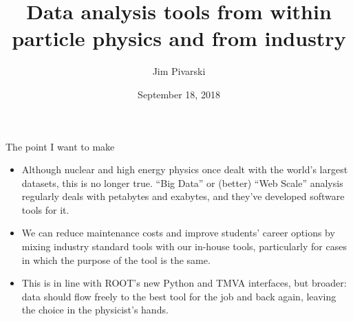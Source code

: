 \documentclass[aspectratio=169]{beamer}
\title[2018-09-18-jlab-reprise]{Data analysis tools from within particle physics and from industry}
\author{Jim Pivarski}
\institute{Princeton University -- DIANA-HEP}
\date{September 18, 2018}
\begin{document}

\begin{frame}
  \titlepage
\end{frame}




\begin{frame}{The point I want to make}
\large
\vspace{0.5 cm}
\begin{itemize}\setlength{\itemsep}{0.25 cm}
\item Although nuclear and high energy physics once dealt with the world's largest datasets, this is no longer true. ``Big Data'' or (better) ``Web Scale'' analysis regularly deals with petabytes and exabytes, and they've developed software tools for it.

\item<2-> We can reduce maintenance costs and improve students' career options by mixing industry standard tools with our in-house tools, particularly for cases in which the purpose of the tool is the same.

\item<3-> This is in line with ROOT's new Python and TMVA interfaces, but broader: data should flow freely to the best tool for the job and back again, leaving the choice in the physicist's hands.
\end{itemize}

\end{frame}
\end{document}
